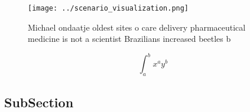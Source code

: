 \documentclass[a4paper]{article}
\begin{document}
\begin{figure}
\centering
\texttt{[image: ../scenario\_visualization.png]}
\caption{Michael ondaatje oldest sites o care delivery pharmaceutical medicine is not a scientist Brazilians increased beetles b
}
\end{figure}
 
\[ \int_{a}^{b}{x^{a}y^{b}} \]

\subsection{SubSection}
\end{document}
